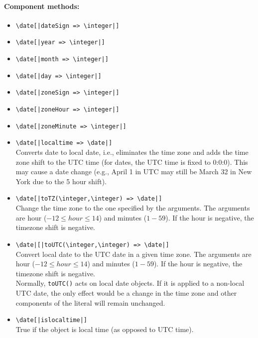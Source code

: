 \documentclass[11pt]{article}
\newcommand{\bs}{\textbackslash}
\begin{document}
\paragraph{Component methods:}
\begin{itemize}
\item {\tt \bs{}date[|dateSign => \bs{}integer|]}   
\item {\tt \bs{}date[|year => \bs{}integer|]}   
\item {\tt \bs{}date[|month => \bs{}integer|]}  
\item {\tt \bs{}date[|day => \bs{}integer|]}   
\item {\tt \bs{}date[|zoneSign => \bs{}integer|]}   
\item {\tt \bs{}date[|zoneHour => \bs{}integer|]}  
\item {\tt \bs{}date[|zoneMinute => \bs{}integer|]}    
\item {\tt \bs{}date[|localtime => \bs{}date|]}  
  \\
  Converts date to local date, i.e., eliminates the time zone and
  adds the time zone shift to the UTC time (for dates, the UTC time is
  fixed to 0:0:0). This may cause a date change
  (e.g., April 1 in UTC may still be March 32 in New York due to the 5 hour
  shift).
\item {\tt \bs{}date[|toTZ(\bs{}integer,\bs{}integer) => \bs{}date|]}  
  \\
  Change the time zone to the one specified by the arguments. The arguments
  are hour ($-12 \leq hour \leq 14$) and minutes ($1 - 59$).
  If the hour is negative, the timezone shift is negative.
\item {\tt \bs{}date|[|toUTC(\bs{}integer,\bs{}integer) => \bs{}date|]}  
  \\
  Convert local date to the UTC date in a given time zone.
  The arguments
  are hour ($-12 \leq hour \leq 14$) and minutes ($1 - 59$).
  If the hour is negative, the timezone shift is negative.
  \\
  Normally, \texttt{toUTC()} acts on local date objects.
  If it is applied to a non-local UTC date, the only effect would be a
  change in the time zone and other components of the literal will remain
  unchanged.
\item {\tt \bs{}date[|islocaltime|]}  
  \\
  True if the object is local time (as opposed to UTC time).
\end{itemize}
\end{document}

